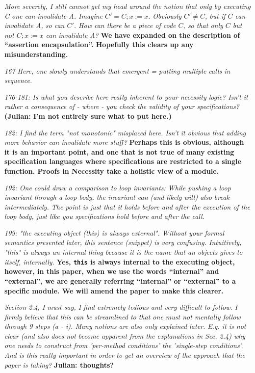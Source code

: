 \documentclass[11pt]{amsart}
\newcommand{\rev}[1]{\emph #1}
\newcommand{\us}[1]{\bf #1}
\begin{document}
{\rev {{ More severely, I still cannot get my head around the notion that only by executing C one can invalidate A. Imagine $C' = C; x:=x$. Obviously $C' \neq C$, but if $C$ can invalidate A, so can $C'$. How can there be a piece of code $C$, so that only $C$ but not $C; x:=x$ can invalidate A? }}}
{\us{We have expanded on the description of ``assertion encapsulation''. Hopefully this clears up any misunderstanding.}}

{\rev {{167 Here, one slowly understands that emergent = putting multiple calls in sequence. }}}

{\rev {{176-181: Is what you describe here really inherent to your necessity logic? Isn't it rather a consequence of - where - you check the validity of your specifications? }}}
{\us{{(Julian: I'm not entirely sure what to put here.)}}}

{\rev {{182: I find the term "not monotonic" misplaced here. Isn't it obvious that adding more behavior can invalidate more stuff? }}}
{\us{Perhaps this is obvious, although it is an important point, and one that is not true of many existing specification languages where specifications are restricted to a single 
function. Proofs in Necessity take a holistic view of a module.}}

{\rev {{192: One could draw a comparison to loop invariants: While pushing a loop invariant through a loop body, the invariant can (and likely will) also break intermediately. The point is just that it holds before and after the execution of the loop body, just like you specifications hold before and after the call. }}}

{\rev {{199: "the executing object (this) is always external". Without your formal semantics presented later, this sentence (snippet) is very confusing. Intuitively, "this" is always an internal thing because it is the name that an objects gives to itself, internally. }}}
{\us{Yes, \texttt{this} is always internal to the executing object, however, in this paper, when we use the words ``internal'' and ``external'', we are generally referring ``internal'' or ``external'' to 
a specific module. We will amend the paper to make this clearer.}}

{\rev {{ Section 2.4, I must say, I find extremely tedious and very difficult to follow. I firmly believe that this can be streamlined to that one must not mentally follow through 9 steps (a - i). Many notions are also only explained later. E.g. it is not clear (and also does not become apparent from the explanations in Sec. 2.4) why one needs to construct from 'per-method conditions' the 'single-step conditions'. And is this really important in order to get an overview of the approach that the paper is taking? }}}
{\us{Julian: thoughts?}}
\end{document}
